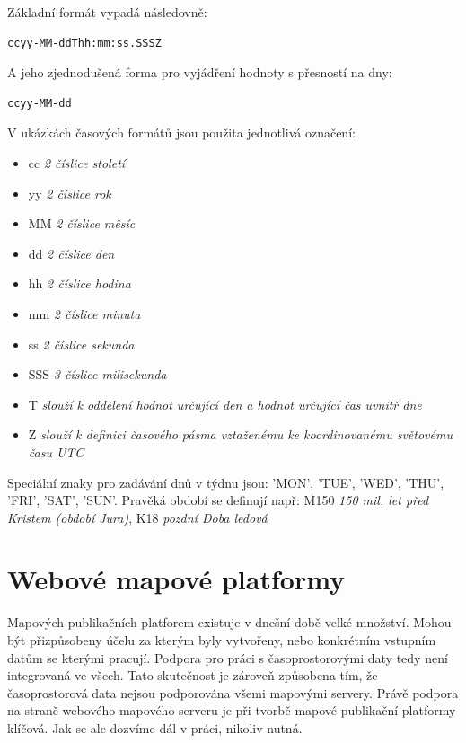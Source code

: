 \noindent
Základní formát vypadá následovně:

\begin{verbatim}
ccyy-MM-ddThh:mm:ss.SSSZ
\end{verbatim}

\noindent
A jeho zjednodušená forma pro vyjádření hodnoty s přesností na dny:

\begin{verbatim}
ccyy-MM-dd
\end{verbatim}

\newpage
\noindent
V ukázkách časových formátů jsou použita jednotlivá označení:

\begin{itemize}
	\item cc \textit{2 číslice století}
	\item yy \textit{2 číslice rok}
	\item MM \textit{2 číslice měsíc}
	\item dd \textit{2 číslice den}
	\item hh \textit{2 číslice hodina}
	\item mm \textit{2 číslice minuta}
	\item ss \textit{2 číslice sekunda}
	\item SSS \textit{3 číslice milisekunda}
\end{itemize}

\begin{itemize}
	\item T \textit{slouží k oddělení hodnot určující den a hodnot určující čas uvnitř dne}
	\item Z \textit{slouží k definici časového pásma vztaženému ke koordinovanému světovému času UTC}
\end{itemize}

Speciální znaky pro zadávání dnů v týdnu jsou: 'MON', 'TUE', 'WED',
'THU', 'FRI', 'SAT', 'SUN'. Pravěká období se definují např: M150
\textit{150 mil. let před Kristem (období Jura)}, K18 \textit{pozdní
  Doba ledová}

\newpage
\section{Webové mapové platformy}
\label{ssec:mapove-platformy}

Mapových publikačních platforem existuje v dnešní době velké
množství. Mohou být přizpůsobeny účelu za kterým byly vytvořeny, nebo
konkrétním vstupním datům se kterými pracují. Podpora pro práci s časoprostorovými daty tedy není integrovaná ve všech. Tato
skutečnost je zároveň způsobena tím, že časoprostorová data nejsou
podporována všemi mapovými servery. Právě podpora na straně webového
mapového serveru je při tvorbě mapové publikační platformy
klíčová. Jak se ale dozvíme dál v práci, nikoliv nutná.
 
